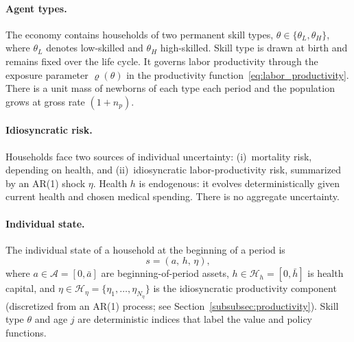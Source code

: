 \documentclass[12pt,a4paper]{article}
\begin{document}
\paragraph{Agent types.}
The economy contains households of two permanent skill types, $\theta \in \{\theta_L, \theta_H\}$, where $\theta_L$ denotes low-skilled and $\theta_H$ high-skilled. Skill type is drawn at birth and remains fixed over the life cycle. It governs labor productivity through the exposure parameter $\varrho(\theta)$ in the productivity function~\eqref{eq:labor_productivity}. There is a unit mass of newborns of each type each period and the population grows at gross rate $(1 + n_p)$.

\paragraph{Idiosyncratic risk.}
Households face two sources of individual uncertainty: (i)~mortality risk, depending on health, and (ii)~idiosyncratic labor-productivity risk, summarized by an AR(1) shock $\eta$. Health $h$ is endogenous: it evolves deterministically given current health and chosen medical spending. There is no aggregate uncertainty.

\paragraph{Individual state.}
The individual state of a household at the beginning of a period is
\begin{equation}
\label{eq:state}
s = (a,\, h,\, \eta),
\end{equation}
where $a \in \mathcal{A} = [0, \bar{a}]$ are beginning-of-period assets, $h \in \mathcal{H}_h = [0, \bar{h}]$ is health capital, and $\eta \in \mathcal{H}_\eta = \{\eta_1, \ldots, \eta_{N_\eta}\}$ is the idiosyncratic productivity component (discretized from an AR(1) process; see Section~\ref{subsubsec:productivity}). Skill type $\theta$ and age $j$ are deterministic indices that label the value and policy functions.
\end{document}

